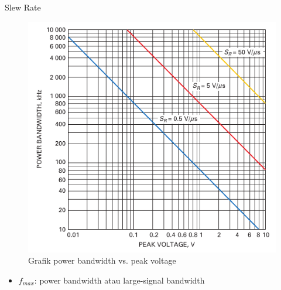 \begin{frame}{Slew Rate}
	\begin{multicols}{2}
		\begin{figure}
			\centering
			\includegraphics[width=0.8\linewidth]{gambar/fig-16.10}
			\caption{Grafik power bandwidth vs. peak voltage}
			\label{fig-16.10}
		\end{figure}
		\columnbreak
		\begin{itemize}
			\item  $ f_{max} $: power bandwidth atau large-signal bandwidth
		\end{itemize}
	\end{multicols}	
\end{frame}